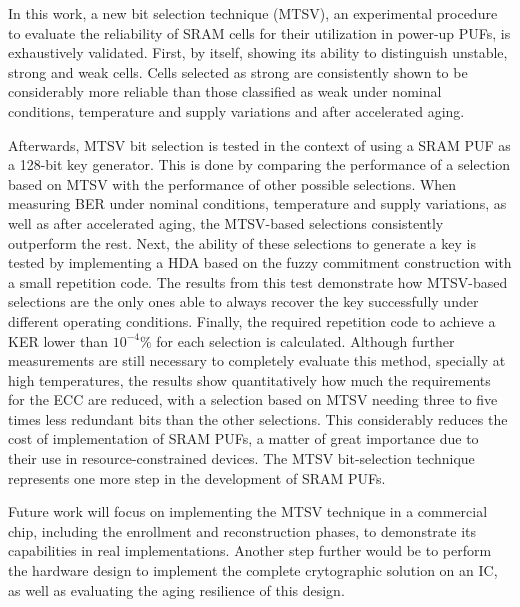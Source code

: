 In this work, a new bit selection technique (MTSV), an experimental procedure to evaluate the reliability of SRAM cells for their utilization in power-up PUFs, is exhaustively validated. First, by itself, showing its ability to distinguish unstable, strong and weak cells. Cells selected as strong are consistently shown to be considerably more reliable than those classified as weak under nominal conditions, temperature and supply variations and after accelerated aging. 

Afterwards, MTSV bit selection is tested in the context of using a SRAM PUF as a 128-bit key generator. This is done by comparing the performance of a selection based on MTSV with the performance of other possible selections. When measuring BER under nominal conditions, temperature and supply variations, as well as after accelerated aging, the MTSV-based selections consistently outperform the rest. Next, the ability of these selections to generate a key is tested by implementing a HDA based on the fuzzy commitment construction with a small repetition code. The results from this test demonstrate how MTSV-based selections are the only ones able to always recover the key successfully under different operating conditions. Finally, the required repetition code to achieve a KER lower than $10^{-4} \%$ for each selection is calculated. Although further measurements are still necessary to completely evaluate this method, specially at high temperatures, the results show quantitatively how much the requirements for the ECC are reduced, with a selection based on MTSV needing three to five times less redundant bits than the other selections. This considerably reduces the cost of implementation of SRAM PUFs, a matter of great importance due to their use in resource-constrained devices. The MTSV bit-selection technique represents one more step in the development of SRAM PUFs.

Future work will focus on implementing the MTSV technique in a commercial chip, including the enrollment and reconstruction phases, to demonstrate its capabilities in real implementations. Another step further would be to perform the hardware design to implement the complete crytographic solution on an IC, as well as evaluating the aging resilience of this design.